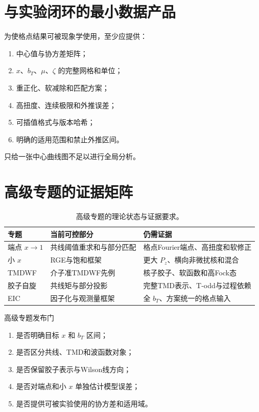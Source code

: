 \documentclass[UTF8,12pt,a4paper,twoside,openany]{ctexbook}
\begin{document}
\section{与实验闭环的最小数据产品}

为使格点结果可被现象学使用，至少应提供：
\begin{enumerate}
  \item 中心值与协方差矩阵；
  \item \(x\)、\(b_T\)、\(\mu\)、\(\zeta\) 的完整网格和单位；
  \item 重正化、软减除和匹配方案；
  \item 高扭度、连续极限和外推误差；
  \item 可插值格式与版本哈希；
  \item 明确的适用范围和禁止外推区间。
\end{enumerate}
只给一张中心曲线图不足以进行全局分析。

\section{高级专题的证据矩阵}

\begin{table}[htbp]
\centering
\caption{高级专题的理论状态与证据要求。}
\label{tab:advanced-status}
\small
\begin{tabularx}{\textwidth}{L{2.7cm}L{3.8cm}Y}
\toprule
专题 & 当前可控部分 & 仍需证据 \\
\midrule
端点 \(x\to1\) & 共线阈值重求和与部分匹配 & 格点Fourier端点、高扭度和软修正 \\
小 \(x\) & RGE与饱和框架 & 更大 \(P_z\)、横向非微扰核和混合 \\
TMDWF & 介子准TMDWF先例 & 核子胶子、软函数和高Fock态 \\
胶子自旋 & 共线矩与部分投影 & 完整TMD表示、T-odd与过程依赖 \\
EIC & 因子化与观测量框架 & 全 \(b_T\)、方案统一的格点输入 \\
\bottomrule
\end{tabularx}
\end{table}

\begin{checkpointbox}{高级专题发布门}
\begin{enumerate}
  \item 是否明确目标 \(x\) 和 \(b_T\) 区间；
  \item 是否区分共线、TMD和波函数对象；
  \item 是否保留胶子表示与Wilson线方向；
  \item 是否对端点和小 \(x\) 单独估计模型误差；
  \item 是否提供可被实验使用的协方差和适用域。
\end{enumerate}
\end{checkpointbox}
\end{document}
